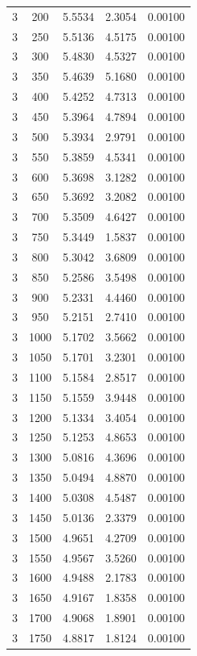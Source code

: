 \begin{longtable}{ccccc}
    3 & 200 & 5.5534 & 2.3054 & 0.00100 \\
    3 & 250 & 5.5136 & 4.5175 & 0.00100 \\
    3 & 300 & 5.4830 & 4.5327 & 0.00100 \\
    3 & 350 & 5.4639 & 5.1680 & 0.00100 \\
    3 & 400 & 5.4252 & 4.7313 & 0.00100 \\
    3 & 450 & 5.3964 & 4.7894 & 0.00100 \\
    3 & 500 & 5.3934 & 2.9791 & 0.00100 \\
    3 & 550 & 5.3859 & 4.5341 & 0.00100 \\
    3 & 600 & 5.3698 & 3.1282 & 0.00100 \\
    3 & 650 & 5.3692 & 3.2082 & 0.00100 \\
    3 & 700 & 5.3509 & 4.6427 & 0.00100 \\
    3 & 750 & 5.3449 & 1.5837 & 0.00100 \\
    3 & 800 & 5.3042 & 3.6809 & 0.00100 \\
    3 & 850 & 5.2586 & 3.5498 & 0.00100 \\
    3 & 900 & 5.2331 & 4.4460 & 0.00100 \\
    3 & 950 & 5.2151 & 2.7410 & 0.00100 \\
    3 & 1000 & 5.1702 & 3.5662 & 0.00100 \\
    3 & 1050 & 5.1701 & 3.2301 & 0.00100 \\
    3 & 1100 & 5.1584 & 2.8517 & 0.00100 \\
    3 & 1150 & 5.1559 & 3.9448 & 0.00100 \\
    3 & 1200 & 5.1334 & 3.4054 & 0.00100 \\
    3 & 1250 & 5.1253 & 4.8653 & 0.00100 \\
    3 & 1300 & 5.0816 & 4.3696 & 0.00100 \\
    3 & 1350 & 5.0494 & 4.8870 & 0.00100 \\
    3 & 1400 & 5.0308 & 4.5487 & 0.00100 \\
    3 & 1450 & 5.0136 & 2.3379 & 0.00100 \\
    3 & 1500 & 4.9651 & 4.2709 & 0.00100 \\
    3 & 1550 & 4.9567 & 3.5260 & 0.00100 \\
    3 & 1600 & 4.9488 & 2.1783 & 0.00100 \\
    3 & 1650 & 4.9167 & 1.8358 & 0.00100 \\
    3 & 1700 & 4.9068 & 1.8901 & 0.00100 \\
    3 & 1750 & 4.8817 & 1.8124 & 0.00100 \\

\end{longtable}
